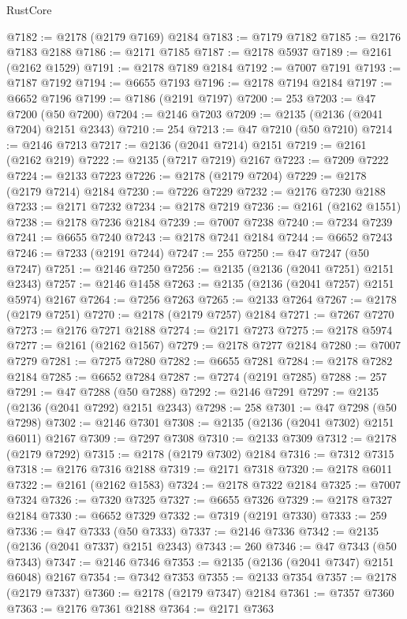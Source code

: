 \begin{lexlean}{RustCore}
\begin{coremodule}
@7182 := @2178 (@2179 @7169) @2184
@7183 := @7179 @7182
@7185 := @2176 @7183 @2188
@7186 := @2171 @7185
@7187 := @2178 @5937
@7189 := @2161 (@2162 @1529)
@7191 := @2178 @7189 @2184
@7192 := @7007 @7191
@7193 := @7187 @7192
@7194 := @6655 @7193
@7196 := @2178 @7194 @2184
@7197 := @6652 @7196
@7199 := @7186 (@2191 @7197)
@7200 := 253
@7203 := @47 @7200 (@50 @7200)
@7204 := @2146 @7203
@7209 := @2135 (@2136 (@2041 @7204) @2151 @2343)
@7210 := 254
@7213 := @47 @7210 (@50 @7210)
@7214 := @2146 @7213
@7217 := @2136 (@2041 @7214) @2151
@7219 := @2161 (@2162 @219)
@7222 := @2135 (@7217 @7219) @2167
@7223 := @7209 @7222
@7224 := @2133 @7223
@7226 := @2178 (@2179 @7204)
@7229 := @2178 (@2179 @7214) @2184
@7230 := @7226 @7229
@7232 := @2176 @7230 @2188
@7233 := @2171 @7232
@7234 := @2178 @7219
@7236 := @2161 (@2162 @1551)
@7238 := @2178 @7236 @2184
@7239 := @7007 @7238
@7240 := @7234 @7239
@7241 := @6655 @7240
@7243 := @2178 @7241 @2184
@7244 := @6652 @7243
@7246 := @7233 (@2191 @7244)
@7247 := 255
@7250 := @47 @7247 (@50 @7247)
@7251 := @2146 @7250
@7256 := @2135 (@2136 (@2041 @7251) @2151 @2343)
@7257 := @2146 @1458
@7263 := @2135 (@2136 (@2041 @7257) @2151 @5974) @2167
@7264 := @7256 @7263
@7265 := @2133 @7264
@7267 := @2178 (@2179 @7251)
@7270 := @2178 (@2179 @7257) @2184
@7271 := @7267 @7270
@7273 := @2176 @7271 @2188
@7274 := @2171 @7273
@7275 := @2178 @5974
@7277 := @2161 (@2162 @1567)
@7279 := @2178 @7277 @2184
@7280 := @7007 @7279
@7281 := @7275 @7280
@7282 := @6655 @7281
@7284 := @2178 @7282 @2184
@7285 := @6652 @7284
@7287 := @7274 (@2191 @7285)
@7288 := 257
@7291 := @47 @7288 (@50 @7288)
@7292 := @2146 @7291
@7297 := @2135 (@2136 (@2041 @7292) @2151 @2343)
@7298 := 258
@7301 := @47 @7298 (@50 @7298)
@7302 := @2146 @7301
@7308 := @2135 (@2136 (@2041 @7302) @2151 @6011) @2167
@7309 := @7297 @7308
@7310 := @2133 @7309
@7312 := @2178 (@2179 @7292)
@7315 := @2178 (@2179 @7302) @2184
@7316 := @7312 @7315
@7318 := @2176 @7316 @2188
@7319 := @2171 @7318
@7320 := @2178 @6011
@7322 := @2161 (@2162 @1583)
@7324 := @2178 @7322 @2184
@7325 := @7007 @7324
@7326 := @7320 @7325
@7327 := @6655 @7326
@7329 := @2178 @7327 @2184
@7330 := @6652 @7329
@7332 := @7319 (@2191 @7330)
@7333 := 259
@7336 := @47 @7333 (@50 @7333)
@7337 := @2146 @7336
@7342 := @2135 (@2136 (@2041 @7337) @2151 @2343)
@7343 := 260
@7346 := @47 @7343 (@50 @7343)
@7347 := @2146 @7346
@7353 := @2135 (@2136 (@2041 @7347) @2151 @6048) @2167
@7354 := @7342 @7353
@7355 := @2133 @7354
@7357 := @2178 (@2179 @7337)
@7360 := @2178 (@2179 @7347) @2184
@7361 := @7357 @7360
@7363 := @2176 @7361 @2188
@7364 := @2171 @7363

\end{coremodule}
\end{lexlean}
